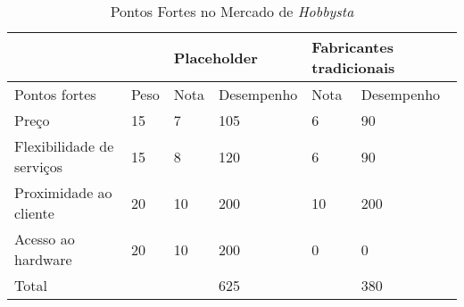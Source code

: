 \begin{table}[!htbp]
	\centering

	\begin{tabular}{ll|l|l|l|l|}
		\cline{3-6}
		&      & \multicolumn{2}{l|}{Placeholder} & \multicolumn{2}{l|}{Fabricantes tradicionais} \\ \hline
		\multicolumn{1}{|l|}{Pontos fortes}             & Peso & Nota         & Desempenho        & Nota               & Desempenho               \\ \hline
		\multicolumn{1}{|l|}{Preço}                     & 15   & 7            & 105               & 6                  & 90                      \\ \hline
		\multicolumn{1}{|l|}{Flexibilidade de serviços} & 15   & 8            & 120               & 6                  & 90                      \\ \hline
		\multicolumn{1}{|l|}{Proximidade ao cliente}    & 20   & 10           & 200               & 10                 & 200                      \\ \hline
		\multicolumn{1}{|l|}{Acesso ao hardware}        & 20   & 10           & 200               & 0                  & 0                       \\ \hline
		\multicolumn{1}{|l|}{Total}                     &      &              & 625               &                    & 380                      \\ \hline
	\end{tabular}
	\label{pontoForteHobby}
	\caption{Pontos Fortes no Mercado de \emph{Hobbysta}}
\end{table}

